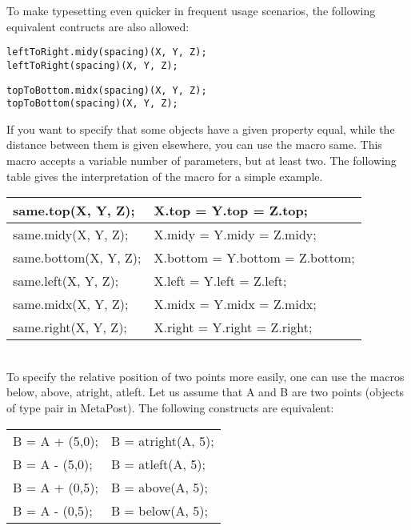 \documentclass{article}
\newcommand{\code}{\ttfamily}
\begin{document}
To make typesetting even quicker in frequent usage scenarios, the following equivalent contructs are also allowed:

\begin{verbatim}
leftToRight.midy(spacing)(X, Y, Z);
leftToRight(spacing)(X, Y, Z);
\end{verbatim}

\begin{verbatim}
topToBottom.midx(spacing)(X, Y, Z);
topToBottom(spacing)(X, Y, Z);
\end{verbatim}

If you want to specify that some objects have a given property equal, while the distance between them is given elsewhere, you can use the macro {\code same}.
This macro accepts a variable number of parameters, but at least two. The following table gives the interpretation of the macro for a simple example.

\begin{tabular}{||l|l||}
\hline
{\code same.top(X, Y, Z);} & {\code X.top = Y.top = Z.top;} \\
\hline
{\code same.midy(X, Y, Z);} & {\code X.midy = Y.midy = Z.midy;} \\
\hline
{\code same.bottom(X, Y, Z);} & {\code X.bottom = Y.bottom = Z.bottom;} \\
\hline
{\code same.left(X, Y, Z);} & {\code X.left = Y.left = Z.left;} \\
\hline
{\code same.midx(X, Y, Z);} & {\code X.midx = Y.midx = Z.midx;} \\
\hline
{\code same.right(X, Y, Z);} & {\code X.right = Y.right = Z.right;} \\
\hline
\end{tabular} \\


To specify the relative position of two points more easily, one can use the macros {\code below}, {\code above}, {\code atright}, {\code atleft}. Let us assume that {\code A} and {\code B} are two points (objects of type {\code pair} in MetaPost). The following constructs are equivalent:

\begin{tabular}{||l|l||}
\hline
{\code B = A + (5,0);} & {\code B = atright(A, 5);} \\
{\code B = A - (5,0);} & {\code B = atleft(A, 5);} \\
{\code B = A + (0,5);} & {\code B = above(A, 5);} \\
{\code B = A - (0,5);} & {\code B = below(A, 5);} \\
\hline
\end{tabular}
\end{document}
